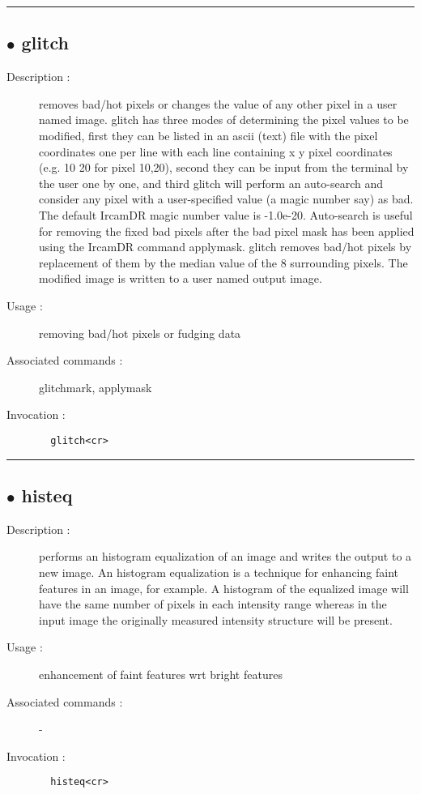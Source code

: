 \hrule \subsection*{$\bullet$ glitch}
\begin{description}
\item[Description :] removes bad/hot pixels or changes the value of any other pixel
in a user named image.  glitch has three modes of determining the pixel
values to be modified, first they can be listed in an ascii (text) file
with the pixel coordinates one per line with each line containing x y
pixel coordinates (e.g. 10 20 for pixel 10,20), second they can be input
from the terminal by the user one by one, and third glitch will perform
an auto-search and consider any pixel with a user-specified value (a
magic number say) as bad.  The default IrcamDR magic number value is
-1.0e-20.  Auto-search is useful for removing the fixed bad pixels after
the bad pixel mask has been applied using the IrcamDR command applymask.
glitch removes bad/hot pixels by replacement of them by the median value
of the 8 surrounding pixels.  The modified image is written to a user
named output image.
\item[Usage :] removing bad/hot pixels or fudging data
\item[Associated commands :] glitchmark, applymask
\item[Invocation :]

\verb+  glitch<cr> +\end{description}

\hrule \subsection*{$\bullet$ histeq}
\begin{description}
\item[Description :] performs an histogram equalization of an image and writes the
output to a new image.  An histogram equalization is a technique for
enhancing faint features in an image, for example.  A histogram of the
equalized image will have the same number of pixels in each intensity
range whereas in the input image the originally measured intensity
structure will be present.
\item[Usage :] enhancement of faint features wrt bright features
\item[Associated commands :] -
\item[Invocation :]

\verb+  histeq<cr> +\end{description}

